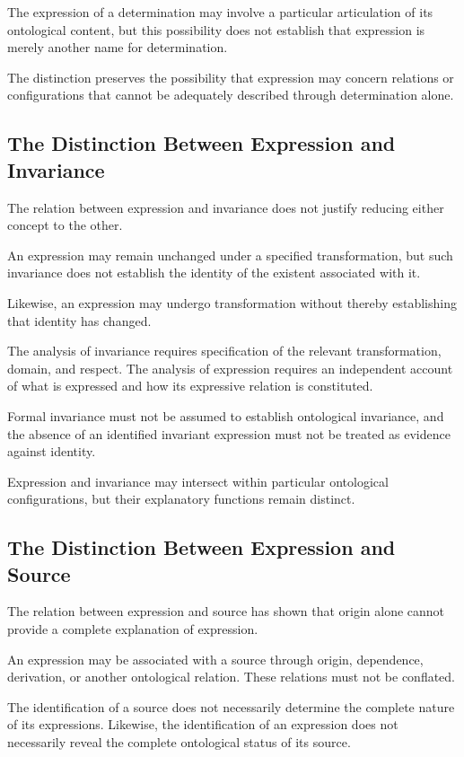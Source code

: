 The expression of a determination may involve
a particular articulation of its ontological content,
but this possibility does not establish that expression
is merely another name for determination.

The distinction preserves the possibility that expression
may concern relations or configurations that cannot
be adequately described through determination alone.

\subsection{The Distinction Between Expression and Invariance}

The relation between expression and invariance
does not justify reducing either concept to the other.

An expression may remain unchanged under a specified
transformation, but such invariance does not establish
the identity of the existent associated with it.

Likewise, an expression may undergo transformation
without thereby establishing that identity has changed.

The analysis of invariance requires specification
of the relevant transformation, domain, and respect.
The analysis of expression requires an independent
account of what is expressed and how its expressive
relation is constituted.

Formal invariance must not be assumed to establish
ontological invariance, and the absence of an identified
invariant expression must not be treated as evidence
against identity.

Expression and invariance may intersect within particular
ontological configurations, but their explanatory
functions remain distinct.

\subsection{The Distinction Between Expression and Source}

The relation between expression and source has shown
that origin alone cannot provide a complete explanation
of expression.

An expression may be associated with a source through
origin, dependence, derivation, or another ontological
relation. These relations must not be conflated.

The identification of a source does not necessarily
determine the complete nature of its expressions.
Likewise, the identification of an expression does
not necessarily reveal the complete ontological status
of its source.


